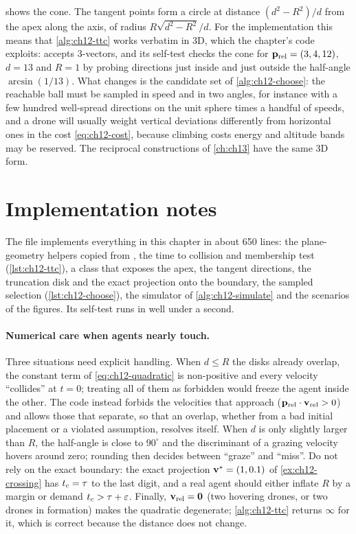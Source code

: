  shows the cone. The tangent points form
a circle at distance $(d^2-R^2)/d$ from the apex along the axis, of radius
$R\sqrt{d^2-R^2}/d$. For the implementation this means that \cref{alg:ch12-ttc}
works verbatim in 3D, which the chapter's code exploits: 
accepts 3-vectors, and its self-test checks the cone for
$\mathbf{p}_{\mathrm{rel}} = (3,4,12)$, $d = 13$ and $R = 1$ by probing directions
just inside and just outside the half-angle $\arcsin(1/13)$. What changes is
the candidate set of \cref{alg:ch12-choose}: the reachable ball must be
sampled in speed and in two angles, for instance with a few hundred
well-spread directions on the unit sphere times a handful of speeds, and a
drone will usually weight vertical deviations differently from horizontal ones
in the cost \cref{eq:ch12-cost}, because climbing costs energy and altitude
bands may be reserved. The reciprocal constructions of \cref{ch:ch13} have the
same 3D form.

\section{Implementation notes}
\label{sec:ch12-implementation}

The file  implements everything in this
chapter in about 650 lines: the plane-geometry helpers copied from
, the time to collision and membership test
(\cref{lst:ch12-ttc}), a  class that exposes the apex,
the tangent directions, the truncation disk and the exact projection onto the
boundary, the sampled selection (\cref{lst:ch12-choose}), the simulator of
\cref{alg:ch12-simulate} and the scenarios of the figures. Its self-test runs
in well under a second.

\paragraph{Numerical care when agents nearly touch.}
Three situations need explicit handling. When $d \le R$ the disks already
overlap, the constant term of \cref{eq:ch12-quadratic} is non-positive and
every velocity ``collides'' at $t = 0$; treating all of them as forbidden would
freeze the agent inside the other. The code instead forbids the velocities that
approach ($\mathbf{p}_{\mathrm{rel}}\cdot\mathbf{v}_{\mathrm{rel}} > 0$) and allows those
that separate, so that an overlap, whether from a bad initial placement or a
violated assumption, resolves itself. When $d$ is only slightly larger than
$R$, the half-angle is close to $90^\circ$ and the discriminant of a grazing
velocity hovers around zero; rounding then decides between ``graze'' and
``miss''. Do not rely on the exact boundary: the exact projection
$\mathbf{v}^* = (1,0.1)$ of \cref{ex:ch12-crossing} has $t_c = \tau$ to the last
digit, and a real agent should either inflate $R$ by a margin or demand
$t_c > \tau + \varepsilon$. Finally, $\mathbf{v}_{\mathrm{rel}} = \mathbf{0}$ (two
hovering drones, or two drones in formation) makes the quadratic degenerate;
\cref{alg:ch12-ttc} returns $\infty$ for it, which is correct because the
distance does not change.


